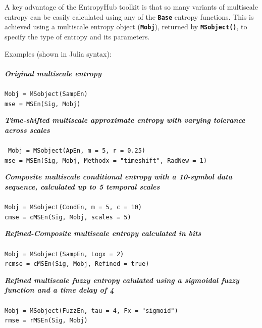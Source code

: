 \documentclass[12pt, a4paper, titlepage, openany]{book}
\begin{document}
A key advantage of the EntropyHub toolkit is that so many variants of multiscale entropy can be easily
calculated using any of the \texttt{\textbf{Base}} entropy functions.  This is achieved using a multiscale entropy object (\texttt{\textbf{Mobj}}), returned by \texttt{\textbf{MSobject()}}, to specify the type of entropy and its parameters.
\begin{center}
\end{center}
 
\noindent Examples (shown in Julia syntax)$\colon$ \footnotesize
\\ \ \\ \noindent \emph{\textbf{Original multiscale entropy}} \cite{MS1}
\\ \ \\ \indent \texttt{Mobj = MSobject(SampEn) \\
\indent mse = MSEn(Sig, Mobj)}

\noindent \emph{\textbf{Time-shifted multiscale approximate entropy with varying tolerance across scales}} \cite{MS2} \\
\\ \ \indent \texttt{Mobj = MSobject(ApEn, m = 5, r = 0.25)\\
\indent mse = MSEn(Sig, Mobj, Methodx = "timeshift", RadNew = 1)}

\noindent \emph{\textbf{Composite multiscale conditional entropy with a 10-symbol data sequence, calculated up to 5 temporal scales}} \cite{cMS1}
\\ \ \\ \indent \texttt{Mobj = MSobject(CondEn, m = 5, c = 10)\\
\indent cmse = cMSEn(Sig, Mobj, scales = 5)}

\noindent \emph{\textbf{Refined-Composite multiscale entropy calculated in bits}} \cite{cMS2}
\\ \ \\ \indent \texttt{Mobj = MSobject(SampEn, Logx = 2)\\
\indent rcmse = cMSEn(Sig, Mobj, Refined = true)}

\noindent \emph{\textbf{Refined multiscale fuzzy entropy calulated using a sigmoidal fuzzy function and a time delay of 4}}
\\ \ \\ \indent \texttt{Mobj = MSobject(FuzzEn, tau = 4, Fx = "sigmoid")\\
\indent rmse = rMSEn(Sig, Mobj)}
\end{document}
